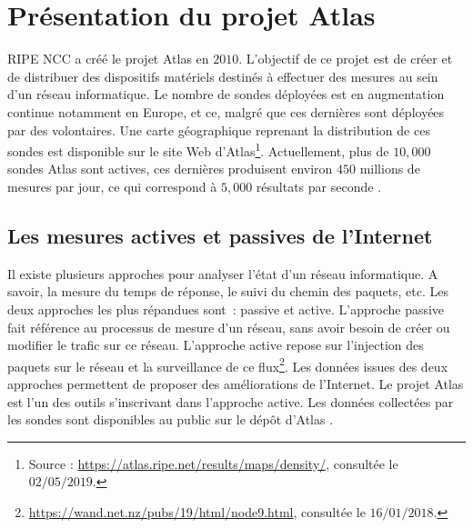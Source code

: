\section{Présentation du projet  Atlas} \label{ripeatlassection}
RIPE NCC a créé le projet  Atlas en $2010$. L'objectif de ce projet est de créer et de distribuer des dispositifs matériels destinés à effectuer des mesures au sein d'un réseau informatique.  Le nombre de sondes déployées est en augmentation continue notamment en Europe, et ce, malgré que ces dernières sont déployées par des volontaires. Une carte géographique reprenant la distribution de ces sondes est disponible sur le site Web d'Atlas\footnote{Source : \url{https://atlas.ripe.net/results/maps/density/}, consultée le $02/05/2019$.}.
Actuellement,  plus de $10,000$ sondes Atlas sont actives, ces dernières produisent environ $450$ millions de mesures par jour, ce qui correspond à  $5,000$ résultats par seconde \cite{WinNT}.


\subsection{Les mesures  actives et passives de l'Internet}
Il existe plusieurs approches pour analyser l'état  d'un réseau informatique. A savoir, la mesure du temps de réponse, le suivi du chemin des paquets, etc.  Les deux approches les plus répandues sont~:   passive et active. L'approche passive fait référence au processus de mesure d'un réseau, sans avoir besoin de créer ou modifier le trafic sur ce réseau.   L'approche active  repose sur l'injection des paquets  sur le réseau et la surveillance  de ce flux\footnote{\url{https://wand.net.nz/pubs/19/html/node9.html}, consultée le $16/01/2018$.}.
Les données issues des deux approches permettent de  proposer des améliorations de l'Internet. Le projet  Atlas est l'un des outils s'inscrivant dans l'approche active.  Les données collectées par les sondes sont disponibles au public sur le dépôt d'Atlas \cite{ripe-atlas-data}.



